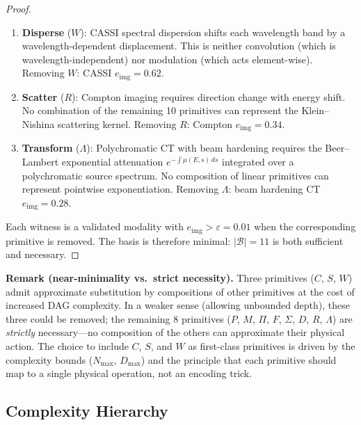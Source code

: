\documentclass[11pt]{article}
\theoremstyle{definition}
\begin{document}
\begin{proof}
\begin{enumerate}
    set $\Omega \subsetneq \{1,\ldots,n\}$.  While $M$ with a binary mask
    achieves the same effect in the spatial domain, $S$ operates in $k$-space
    on non-uniform grids where $M$ is not defined without first applying $F^{-1}$.
    Removing $S$: accelerated MRI $e_{\mathrm{img}} = 0.15$.
  \item \textbf{Disperse} ($W$): CASSI spectral dispersion shifts each wavelength
    band by a wavelength-dependent displacement.  This is neither convolution
    (which is wavelength-independent) nor modulation (which acts element-wise).
    Removing $W$: CASSI $e_{\mathrm{img}} = 0.62$.
  \item \textbf{Scatter} ($R$): Compton imaging requires direction change with
    energy shift.  No combination of the remaining 10 primitives can
    represent the Klein--Nishina scattering kernel.
    Removing $R$: Compton $e_{\mathrm{img}} = 0.34$.
  \item \textbf{Transform} ($\Lambda$): Polychromatic CT with beam hardening
    requires the Beer--Lambert exponential attenuation $e^{-\int \mu(E,s)\,ds}$
    integrated over a polychromatic source spectrum.  No composition of linear
    primitives can represent pointwise exponentiation.
    Removing $\Lambda$: beam hardening CT $e_{\mathrm{img}} = 0.28$.
\end{enumerate}

\noindent Each witness is a validated modality with $e_{\mathrm{img}} > \varepsilon = 0.01$ when the corresponding primitive is removed. The basis is therefore minimal: $|\mathcal{B}| = 11$ is both sufficient and necessary.
\end{proof}

\noindent\textbf{Remark (near-minimality vs.\ strict necessity).}
Three primitives ($C$, $S$, $W$) admit approximate substitution by compositions of other primitives at the cost of increased DAG complexity. In a weaker sense (allowing unbounded depth), these three could be removed; the remaining 8 primitives ($P$, $M$, $\Pi$, $F$, $\Sigma$, $D$, $R$, $\Lambda$) are \emph{strictly} necessary---no composition of the others can approximate their physical action. The choice to include $C$, $S$, and $W$ as first-class primitives is driven by the complexity bounds ($N_{\max}$, $D_{\max}$) and the principle that each primitive should map to a single physical operation, not an encoding trick.

\subsection{Complexity Hierarchy}
\label{sec:complexity}
\end{document}
